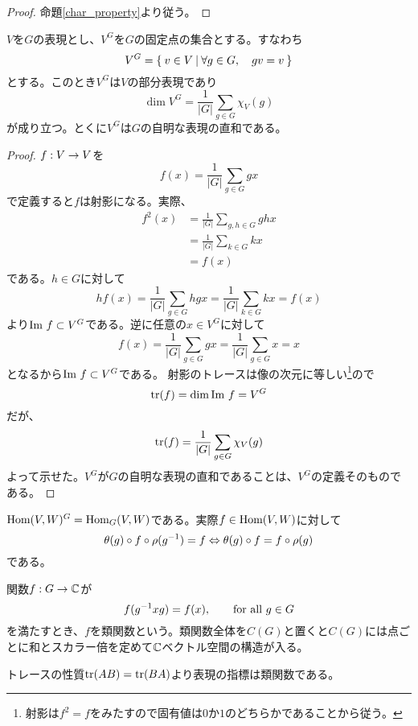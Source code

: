 \documentclass{ltjsreport}
\begin{document}
\begin{proof}
  命題\ref{char_property}より従う。
\end{proof}

\begin{lemm}\label{fix_dim}
  $V$を$G$の表現とし、$V^G$を$G$の固定点の集合とする。すなわち
  \[
  V^G=\left\{\:v\in V\:\middle|\:\forall g\in G,\quad gv=v\:\right\}  
  \]
  とする。このとき$V^G$は$V$の部分表現であり
  \[
  \dim V^G=\frac{1}{|G|}\sum_{g\in G}\chi_V(g)
  \]
  が成り立つ。とくに$V^G$は$G$の自明な表現の直和である。
\end{lemm}

\begin{proof}
  $f:V\rightarrow V$を
  \[
  f(x)=\frac{1}{|G|}\sum_{g\in G}gx
  \]
  で定義すると$f$は射影になる。実際、
  \begin{align*}
    f^2(x)&=\frac{1}{|G|}\sum_{g,h\in G}ghx\\
    &=\frac{1}{|G|}\sum_{k\in G}kx\\
    &=f(x)
  \end{align*}
  である。$h\in G$に対して
  \[
  hf(x)=\frac{1}{|G|}\sum_{g\in G}hgx=\frac{1}{|G|}\sum_{k\in G}kx=f(x)
  \]
  より$\text{Im } f\subset V^G$である。逆に任意の$x\in V^G$に対して
  \[
  f(x)=\frac{1}{|G|}\sum_{g\in G}gx=\frac{1}{|G|}\sum_{g\in G}x=x  
  \]
  となるから$\text{Im } f\subset V^G$である。 射影のトレースは像の次元に等しい\footnote{
    射影は$f^2=f$をみたすので固有値は$0$か$1$のどちらかであることから従う。
  }ので
  \[
  \text{tr}(f)=\dim \text{Im } f=V^G  
  \]
  だが、
  \[
  \text{tr} (f)=\frac{1}{|G|}\sum_{g\in G}\chi_V(g)  
  \]
  よって示せた。$V^G$が$G$の自明な表現の直和であることは、$V^G$の定義そのものである。
\end{proof}

\begin{eg}
  $\text{Hom}(V,W)^G=\text{Hom}_G(V,W)$である。実際$f\in \text{Hom}(V,W)$に対して
  \[
  \theta(g)\circ f \circ \rho(g^{-1})=f\Leftrightarrow \theta(g)\circ f=f\circ \rho(g)
  \]
  である。
\end{eg}




\begin{defin}
  関数$f:G\rightarrow\mathbb{C}$が
  \[
  f(g^{-1}xg)=f(x),\qquad\text{for all $g\in G$}  
  \]
  を満たすとき、$f$を類関数という。類関数全体を$C(G)$と置くと$C(G)$には点ごとに和とスカラー倍を定めて$\mathbb{C}$ベクトル空間の構造が入る。
\end{defin}

\begin{eg}
  トレースの性質$\text{tr}(AB)=\text{tr}(BA)$より表現の指標は類関数である。
\end{eg}
\end{document}
